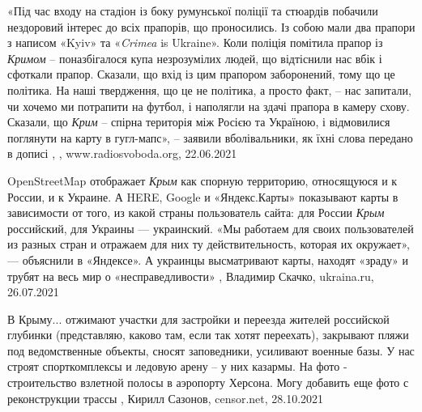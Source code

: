 «Під час входу на стадіон із боку румунської поліції та стюардів побачили
нездоровий інтерес до всіх прапорів, що проносились. Із собою мали два прапори
з написом «Kyiv» та «\emph{Crimea} is Ukraine». Коли поліція помітила прапор із
\emph{Кримом} – поназбігалося купа незрозумілих людей, що відтіснили нас вбік і
сфоткали прапор. Сказали, що вхід із цим прапором заборонений, тому що це
політика. На наші твердження, що це не політика, а просто факт, – нас запитали,
чи хочемо ми потрапити на футбол, і наполягли на здачі прапора в камеру схову.
Сказали, що \emph{Крим} – спірна територія між Росією та Україною, і відмовилися
поглянути на карту в гугл-мапс», – заявили вболівальники, як їхні слова
передано в дописі
, 
, www.radiosvoboda.org, 22.06.2021

OpenStreetMap отображает \emph{Крым} как спорную территорию, относящуюся и к России, и
к Украине. А HERE, Google и «Яндекс.Карты» показывают карты в зависимости от
того, из какой страны пользователь сайта: для России \emph{Крым} российский, для
Украины — украинский. «Мы работаем для своих пользователей из разных стран и
отражаем для них ту действительность, которая их окружает», — объяснили в
«Яндексе». А украинцы высматривают карты, находят «зраду» и трубят на весь мир
о «несправедливости»
, 
Владимир Скачко, ukraina.ru, 26.07.2021

В Крыму... отжимают участки для застройки и переезда жителей российской глубинки
(представляю, каково там, если так хотят переехать), закрывают пляжи под
ведомственные объекты, сносят заповедники, усиливают военные базы. У нас строят
спорткомплексы и ледовую арену – у них казармы. На фото - строительство
взлетной полосы в аэропорту Херсона. Могу добавить еще фото с реконструкции
трассы 
, Кирилл Сазонов, censor.net, 28.10.2021%

